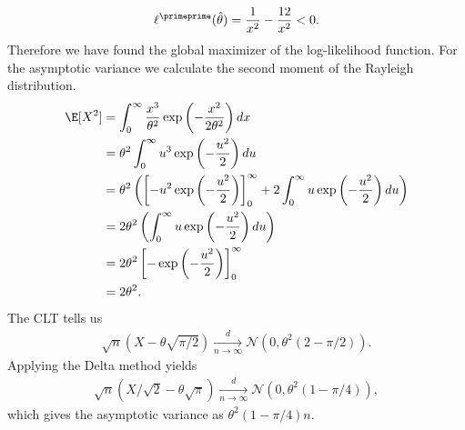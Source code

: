 \begin{solution}
\begin{enumerate}[label = (\alph*)]
  \begin{align*}
    \ell^{\primeprime}(\hat{\theta}) = \frac{1}{x^2} - \frac{12}{x^2} < 0.
  \end{align*}
  Therefore we have found the global maximizer of the log-likelihood function.
  For the asymptotic variance we calculate the second moment of the Rayleigh distribution.
  \begin{align*}
    \E[X^2] &= \int_0^{\infty} \frac{x^3}{\theta^2}\exp\left(-\frac{x^2}{2\theta^2}\right) dx \\
    &= \theta^2 \int_0^{\infty} u^3\exp\left(-\frac{u^2}{2}\right) du \\
    &= \theta^2\left( \left[-u^2\exp\left(-\frac{u^2}{2}\right)\right]_0^\infty
    + 2 \int_0^{\infty} u \exp\left(-\frac{u^2}{2}\right) du\right) \\
    &= 2\theta^2\left(\int_0^{\infty} u \exp\left(-\frac{u^2}{2}\right) du\right) \\
    &= 2\theta^2\left[-\exp\left(-\frac{u^2}{2}\right)\right]_0^\infty \\
    &= 2\theta^2.
  \end{align*}
  The CLT tells us
  \begin{align*}
    \sqrt{n}(X - \theta\sqrt{\pi/2}) \xrightarrow[n \to \infty]{d} \mathcal{N}(0,\theta^2(2-\pi/2)).
  \end{align*}
  Applying the Delta method yields
  \begin{align*}
    \sqrt{n}(X/\sqrt{2} - \theta\sqrt{\pi}) \xrightarrow[n \to \infty]{d} \mathcal{N}(0,\theta^2(1-\pi/4)),
  \end{align*}
  which gives the asymptotic variance as $\theta^2(1-\pi/4)n$.
\end{enumerate}


\end{solution}

